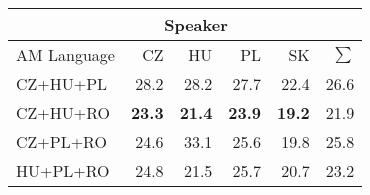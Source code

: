 \begin{tabular}{l|rrrr|r}
\hline
 & \multicolumn{3}{c}{Speaker} & \\
\hline
 AM Language   &   CZ &   HU &   PL &   SK &   $\sum$ \\
\hline
 CZ+HU+PL      & 28.2 & 28.2 & 27.7 & 22.4 &     26.6 \\
CZ+HU+RO      & \bf{23.3} & \bf{21.4} & \bf{23.9} & \bf{19.2} &     21.9 \\
 CZ+PL+RO      & 24.6 & 33.1 & 25.6 & 19.8 &     25.8 \\
 HU+PL+RO      & 24.8 & 21.5 & 25.7 & 20.7 &     23.2 \\
\hline
\end{tabular}
